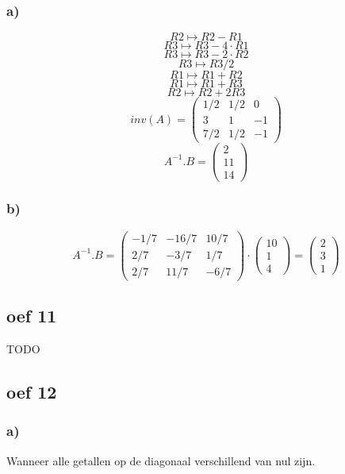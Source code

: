 \documentclass[lineaire_algebra_oplossingen.tex]{subfiles}
\begin{document}
\subsubsection*{a)}
\[R2 \longmapsto R2 - R1 \]
\[R3 \longmapsto R3 -4\cdot R1 \]
\[R3 \longmapsto R3 -2\cdot R2 \]
\[R3 \longmapsto R3/2 \]
\[R1 \longmapsto R1 + R2 \]
\[R1 \longmapsto R1 + R3 \]
\[R2 \longmapsto R2 + 2R3 \]
\[inv(A) = 
\begin{pmatrix}
1/2 & 1/2 & 0\\
3 & 1 & -1\\
7/2 & 1/2 & -1
\end{pmatrix}
\]
\[A^{-1}.B = 
\begin{pmatrix}
2\\
11\\
14
\end{pmatrix}
\]
\subsubsection*{b)}
\[A^{-1}.B = 
\begin{pmatrix}
-1/7 & -16/7 & 10/7\\
2/7 & -3/7 & 1/7\\
2/7 & 11/7 & -6/7
\end{pmatrix}
\cdot
\begin{pmatrix}
10\\
1\\
4
\end{pmatrix}
=
\begin{pmatrix}
2\\
3\\
1
\end{pmatrix}
\]

\subsection{oef 11}
TODO

\subsection{oef 12}
\subsubsection*{a)}
Wanneer alle getallen op de diagonaal verschillend van nul zijn.
\end{document}
